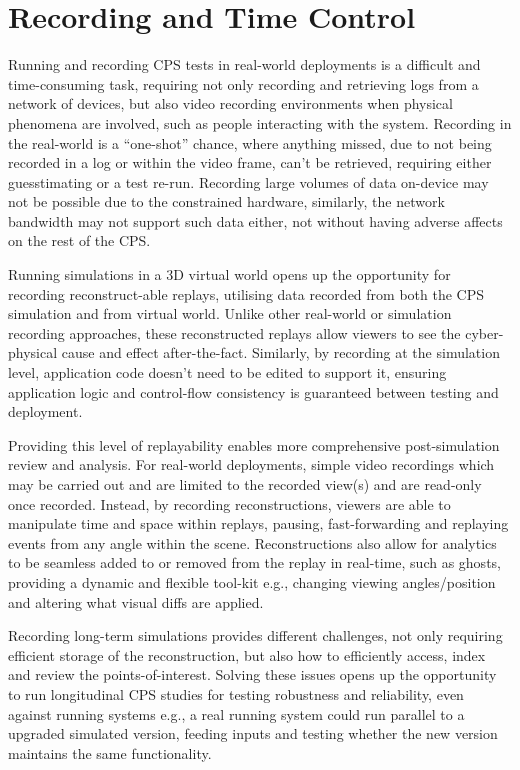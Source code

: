 \section{Recording and Time Control}
\label{sec:recording}
Running and recording CPS tests in real-world deployments is a difficult and time-consuming task, requiring not only recording and retrieving logs from a network of devices, but also video recording environments when physical phenomena are involved, such as people interacting with the system. Recording in the real-world is a ``one-shot'' chance, where anything missed, due to not being recorded in a log or within the video frame, can't be retrieved, requiring either guesstimating or a test re-run. Recording large volumes of data on-device may not be possible due to the constrained hardware, similarly, the network bandwidth may not support such data either, not without having adverse affects on the rest of the CPS. 

Running simulations in a 3D virtual world opens up the opportunity for recording reconstruct-able replays, utilising data recorded from both the CPS simulation and from virtual world. Unlike other real-world or simulation recording approaches, these reconstructed replays allow viewers to see the cyber-physical cause and effect after-the-fact. Similarly, by recording at the simulation level, application code doesn't need to be edited to support it, ensuring application logic and control-flow consistency is guaranteed between testing and deployment.

Providing this level of replayability enables more comprehensive post-simulation review and analysis. For real-world deployments, simple video recordings which may be carried out and are limited to the recorded view(s) and are read-only once recorded. Instead, by recording reconstructions, viewers are able to manipulate time and space within replays, pausing, fast-forwarding and replaying events from any angle within the scene. Reconstructions also allow for analytics to be seamless added to or removed from the replay in real-time, such as ghosts, providing a dynamic and flexible tool-kit e.g., changing viewing angles/position and altering what visual diffs are applied.

Recording long-term simulations provides different challenges, not only requiring efficient storage of the reconstruction, but also how to efficiently access, index and review the points-of-interest. Solving these issues opens up the opportunity to run longitudinal CPS studies for testing robustness and reliability, even against running systems e.g., a real running system could run parallel to a upgraded simulated version, feeding inputs and testing whether the new version maintains the same functionality.

